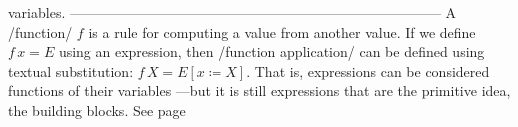 \documentclass[11pt]{article}
\begin{document}
variables.  --------------------------------------------------------------------------------  A /function/ $f$ is a rule for computing a value from another value.  If we define $f\, x = E$ using an expression, then /function application/ can be defined using textual substitution: $f \, X = E[x ≔ X]$. That is, expressions can be considered functions of their variables ---but it is still expressions that are the primitive idea, the building blocks. See page \pageref{org-special-block-extras-glossary-declaration-site-Textual_Substitution}
\end{document}

